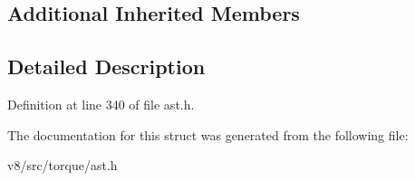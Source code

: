 \subsection*{Additional Inherited Members}


\subsection{Detailed Description}


Definition at line 340 of file ast.\+h.



The documentation for this struct was generated from the following file\+:\begin{DoxyCompactItemize}
\item 
v8/src/torque/ast.\+h\end{DoxyCompactItemize}

